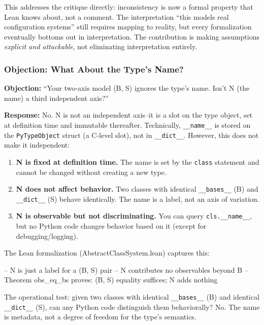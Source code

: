 This addresses the critique directly: inconsistency is now a formal property that Lean knows about, not a comment. The interpretation ``this models real configuration systems'' still requires mapping to reality, but every formalization eventually bottoms out in interpretation. The contribution is making assumptions \emph{explicit and attackable}, not eliminating interpretation entirely.

\subsubsection{Objection: What About the Type's Name?}

\textbf{Objection:} ``Your two-axis model (B, S) ignores the type's name. Isn't N (the name) a third independent axis?''

\textbf{Response:} No. N is not an independent axis--it is a slot on the type object, set at definition time and immutable thereafter. Technically, \texttt{\_\_name\_\_} is stored on the \texttt{PyTypeObject} struct (a C-level slot), not in \texttt{\_\_dict\_\_}. However, this does not make it independent:

\begin{enumerate}
\item \textbf{N is fixed at definition time.} The name is set by the \texttt{class} statement and cannot be changed without creating a new type.

\item \textbf{N does not affect behavior.} Two classes with identical \texttt{\_\_bases\_\_} (B) and \texttt{\_\_dict\_\_} (S) behave identically. The name is a label, not an axis of variation.

\item \textbf{N is observable but not discriminating.} You can query \texttt{cls.\_\_name\_\_}, but no Python code changes behavior based on it (except for debugging/logging).
\end{enumerate}

The Lean formalization (AbstractClassSystem.lean) captures this:

\begin{code}
-- N is just a label for a (B, S) pair
-- N contributes no observables beyond B
-- Theorem obs_eq_bs proves: (B, S) equality suffices; N adds nothing
\end{code}

The operational test: given two classes with identical \texttt{\_\_bases\_\_} (B) and identical \texttt{\_\_dict\_\_} (S), can any Python code distinguish them behaviorally? No. The name is metadata, not a degree of freedom for the type's semantics.

